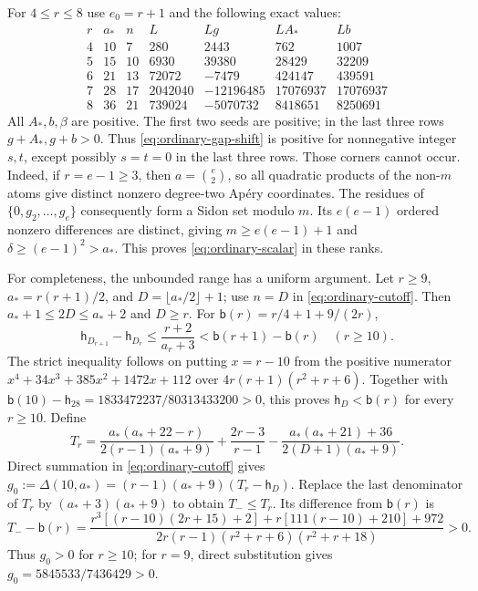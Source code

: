 For $4\le r\le8$ use $e_0=r+1$ and the following exact values:
\[
 \begin{array}{c|r|r|r|r|r|r}
 r&a_*&n&L&Lg&LA_*&Lb\\\hline
 4&10&7&280&2443&762&1007\\
 5&15&10&6930&39380&28429&32209\\
 6&21&13&72072&-7479&424147&439591\\
 7&28&17&2042040&-12196485&17076937&17076937\\
 8&36&21&739024&-5070732&8418651&8250691
 \end{array}
\]
All $A_*,b,\beta$ are positive.  The first two seeds are positive;
in the last three rows $g+A_*,g+b>0$.  Thus
\eqref{eq:ordinary-gap-shift} is positive for nonnegative integer $s,t$,
except possibly $s=t=0$ in the last three rows.
Those corners cannot occur.  Indeed, if $r=e-1\ge3$, then
$a=\binom e2$, so all quadratic products of the non-$m$ atoms give
distinct nonzero degree-two Ap\'ery coordinates.  The residues of
$\{0,g_2,\ldots,g_e\}$ consequently form a Sidon set modulo $m$.
Its $e(e-1)$ ordered nonzero differences are distinct, giving
$m\ge e(e-1)+1$ and $\delta\ge(e-1)^2>a_*$.
This proves \eqref{eq:ordinary-scalar} in these ranks.

For completeness, the unbounded range has a uniform argument.
Let $r\ge9$, $a_*=r(r+1)/2$, and $D=\lfloor a_*/2\rfloor+1$;
use $n=D$ in \eqref{eq:ordinary-cutoff}.  Then
$a_*+1\le2D\le a_*+2$ and $D\ge r$.
For $\mathsf b(r)=r/4+1+9/(2r)$,
\[
 \mathsf h_{D_{r+1}}-\mathsf h_{D_r}
 \le\frac{r+2}{a_r+3}<\mathsf b(r+1)-\mathsf b(r)\quad(r\ge10).
\]
The strict inequality follows on putting $x=r-10$ from the positive
numerator $x^4+34x^3+385x^2+1472x+112$ over
$4r(r+1)(r^2+r+6)$.
Together with
$\mathsf b(10)-\mathsf h_{28}=1833472237/80313433200>0$, this proves
$\mathsf h_D<\mathsf b(r)$ for every $r\ge10$.
Define
\[
 T_r=\frac{a_*(a_*+22-r)}{2(r-1)(a_*+9)}
       +\frac{2r-3}{r-1}
       -\frac{a_*(a_*+21)+36}{2(D+1)(a_*+9)}.
\]
Direct summation in \eqref{eq:ordinary-cutoff} gives
$g_0:=\Delta(10,a_*)=(r-1)(a_*+9)(T_r-\mathsf h_D)$.
Replace the last denominator of $T_r$ by $(a_*+3)(a_*+9)$ to obtain
$T_-\le T_r$.  Its difference from $\mathsf b(r)$ is
\[
 T_--\mathsf b(r)=
 \frac{r^3[(r-10)(2r+15)+2]+r[111(r-10)+210]+972}
 {2r(r-1)(r^2+r+6)(r^2+r+18)}>0.
\]
Thus $g_0>0$ for $r\ge10$; for $r=9$, direct substitution gives
$g_0=5845533/7436429>0$.

